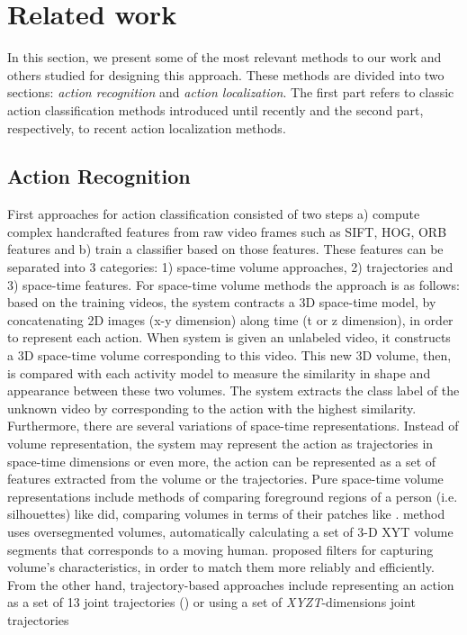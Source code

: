\section{Related work}
In this section, we present some of the most relevant methods to our work and others studied for designing this approach. These methods
 are divided into two sections: \textit{action recognition} and \textit{action localization}. The first part refers to classic action classification methods introduced until recently and the second part, respectively, to recent action localization methods. 
\subsection{Action Recognition}
First approaches for action classification consisted of two steps a) compute complex handcrafted features from raw video frames
such as SIFT, HOG, ORB features and b) train a classifier based on those features. These features can be separated into 3 categories:
1) space-time volume approaches, 2) trajectories and 3) space-time features. For space-time volume methods the approach is as follows:
based on the training videos, the system contracts a 3D space-time model, by concatenating 2D images (x-y dimension) along time (t or z dimension),
in order to represent each action. When system is given an unlabeled video, it constructs a 3D space-time volume corresponding to this video.
This new 3D volume, then, is compared with each activity model to measure the similarity in shape and appearance between these two volumes.
The system extracts the class label of the unknown video by corresponding to the action with the highest similarity. Furthermore, there are
several variations of space-time representations. Instead of volume representation, the system may represent the action as trajectories
in space-time dimensions  or even more, the action can be represented as a set of features extracted from the volume or the trajectories.
Pure space-time volume representations include methods of comparing foreground regions of a person (i.e. silhouettes) like \cite{BobickAaron}
did, comparing volumes in terms of their patches like \cite{1467296}.  \cite{4270510} method uses oversegmented volumes, automatically
calculating a set of 3-D XYT volume segments that corresponds to a moving human. \cite{4587727} proposed filters for
capturing volume's characteristics, in order to match them more reliably and efficiently. From the other hand, trajectory-based approaches
include representing an action as a set of 13 joint trajectories (\cite{1541250}) or using a set of \textit{XYZT}-dimensions joint trajectories
